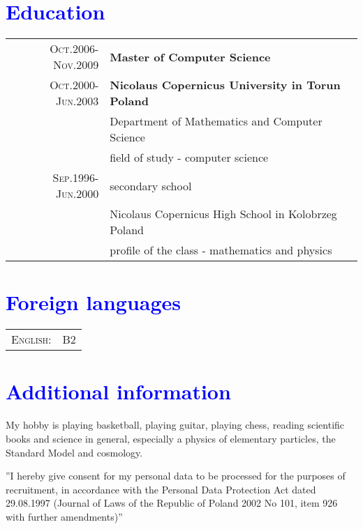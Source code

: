 \documentclass[a4paper,12pt]{article}
\begin{document}
\section{\textcolor{Blue}{Education}}
\begin{tabular}{r|p{11cm}}
	\textsc{Oct.2006-Nov.2009}
		&  \textbf{Master of Computer Science}\\
	\textsc{Oct.2000-Jun.2003}
		&  \textbf{Nicolaus Copernicus University in Torun Poland}\\
		& Department of Mathematics and Computer Science\\
		& field of study - computer science\\

	\textsc{Sep.1996-Jun.2000}
		& secondary school\\
		& Nicolaus Copernicus High School in Kolobrzeg Poland\\
		& profile of the class - mathematics and physics\\
\end{tabular}

\section{\textcolor{Blue}{Foreign languages}}
\begin{tabular}{r|p{11cm}}
	\textsc{English:}&B2\\
\end{tabular}

\section{\textcolor{Blue}{Additional information}}
	My hobby is playing basketball, playing guitar, playing chess, reading scientific books and science in general, especially a
	physics of elementary particles, the Standard Model and cosmology.
\vfill{}

\begin{center}
{\scriptsize
	''I hereby give consent for my personal data to be processed for the purposes of recruitment,
	in accordance with the Personal Data Protection Act dated 29.08.1997
	(Journal of Laws of the Republic of Poland 2002 No 101, item 926 with further amendments)''}
\end{center}
\end{document}
